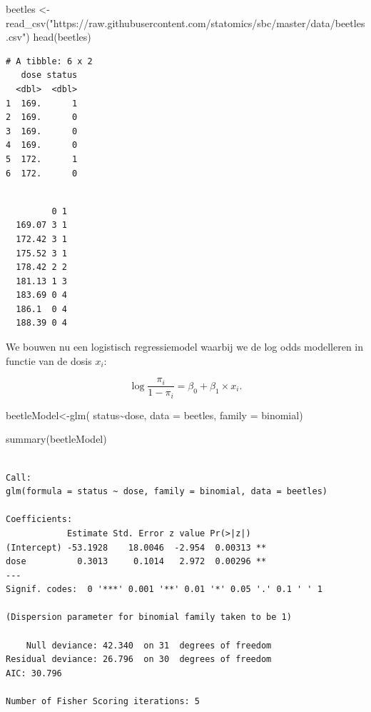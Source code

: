 \documentclass[
  dutch,
  letterpaper,
  12pt]{book}
\newenvironment{Shaded}{\begin{snugshade}}{\end{snugshade}}
\newcommand{\AttributeTok}[1]{\textcolor[rgb]{0.40,0.45,0.13}{#1}}
\newcommand{\FunctionTok}[1]{\textcolor[rgb]{0.28,0.35,0.67}{#1}}
\newcommand{\NormalTok}[1]{\textcolor[rgb]{0.00,0.23,0.31}{#1}}
\newcommand{\OtherTok}[1]{\textcolor[rgb]{0.00,0.23,0.31}{#1}}
\newcommand{\SpecialCharTok}[1]{\textcolor[rgb]{0.37,0.37,0.37}{#1}}
\newcommand{\StringTok}[1]{\textcolor[rgb]{0.13,0.47,0.30}{#1}}
\theoremstyle{definition}
\theoremstyle{definition}
\theoremstyle{definition}
\theoremstyle{remark}
\begin{document}
\begin{Shaded}
\begin{Highlighting}[]
\NormalTok{beetles }\OtherTok{\textless{}{-}} \FunctionTok{read\_csv}\NormalTok{(}\StringTok{"https://raw.githubusercontent.com/statomics/sbc/master/data/beetles.csv"}\NormalTok{)}
\FunctionTok{head}\NormalTok{(beetles)}
\end{Highlighting}
\end{Shaded}

\begin{verbatim}
# A tibble: 6 x 2
   dose status
  <dbl>  <dbl>
1  169.      1
2  169.      0
3  169.      0
4  169.      0
5  172.      1
6  172.      0
\end{verbatim}

\begin{Shaded}
\end{Shaded}

\begin{verbatim}
        
         0 1
  169.07 3 1
  172.42 3 1
  175.52 3 1
  178.42 2 2
  181.13 1 3
  183.69 0 4
  186.1  0 4
  188.39 0 4
\end{verbatim}

We bouwen nu een logistisch regressiemodel waarbij we de log odds
modelleren in functie van de dosis \(x_i\):

\[\log \frac{\pi_i}{1-\pi_i}=\beta_0+\beta_1 \times x_i.\]

\begin{Shaded}
\begin{Highlighting}[]
\NormalTok{beetleModel}\OtherTok{\textless{}{-}}\FunctionTok{glm}\NormalTok{(}
\NormalTok{  status}\SpecialCharTok{\textasciitilde{}}\NormalTok{dose,}
  \AttributeTok{data =}\NormalTok{ beetles,}
  \AttributeTok{family =}\NormalTok{ binomial)}

\FunctionTok{summary}\NormalTok{(beetleModel)}
\end{Highlighting}
\end{Shaded}

\begin{verbatim}

Call:
glm(formula = status ~ dose, family = binomial, data = beetles)

Coefficients:
            Estimate Std. Error z value Pr(>|z|)   
(Intercept) -53.1928    18.0046  -2.954  0.00313 **
dose          0.3013     0.1014   2.972  0.00296 **
---
Signif. codes:  0 '***' 0.001 '**' 0.01 '*' 0.05 '.' 0.1 ' ' 1

(Dispersion parameter for binomial family taken to be 1)

    Null deviance: 42.340  on 31  degrees of freedom
Residual deviance: 26.796  on 30  degrees of freedom
AIC: 30.796

Number of Fisher Scoring iterations: 5
\end{verbatim}
\end{document}
